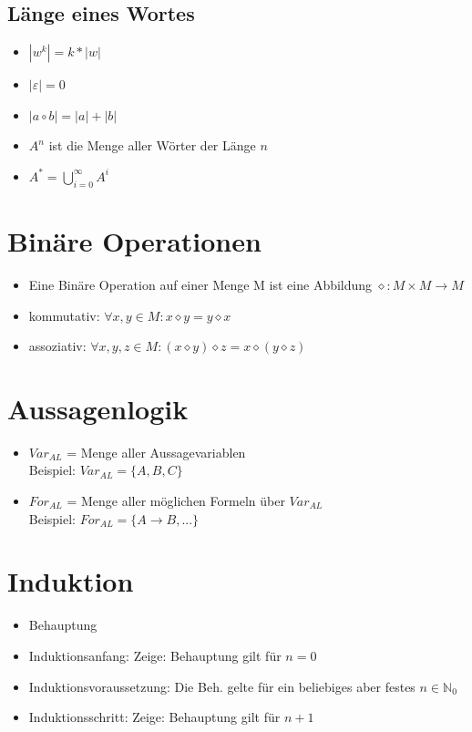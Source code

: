 \documentclass[a4paper,portrait]{scrartcl}
\begin{document}
\subsection{Länge eines Wortes}
\begin{itemize}
\item $ |w^{k}| = k * |w|  $ 
\item $ |\varepsilon| = 0 $ 
\item $ |a \circ b|=|a|+|b| $ 
\item $A^{n}$ ist die Menge aller Wörter der Länge $n$ 
\item $A^{*} = \bigcup\limits_{i = 0}^{\infty} A^{i}$
\end{itemize}
\section{Binäre Operationen}
\begin{itemize}
\item Eine Binäre Operation auf einer Menge M ist eine Abbildung $\diamond: M \times M \rightarrow M$ 
\item kommutativ: $ \forall x,y \in M: x \diamond y = y \diamond x $ 
\item assoziativ: $ \forall x,y,z \in M: (x \diamond y) \diamond z = x \diamond (y \diamond z)$\\
\end{itemize}
\section{Aussagenlogik}
\begin{itemize}
\item $ Var_{AL} $ = Menge aller Aussagevariablen \\
Beispiel: $ Var_{AL} = \lbrace A,B,C \rbrace$
\item $ For_{AL} $ = Menge aller möglichen Formeln über $ Var_{AL} $ \\
Beispiel: $ For_{AL} = \lbrace A \rightarrow B, ...\rbrace$
\end{itemize}
\section{Induktion}
\begin{itemize}
\item Behauptung
\item Induktionsanfang: Zeige: Behauptung gilt für $ n = 0 $
\item Induktionsvoraussetzung: Die Beh. gelte für ein beliebiges aber festes $n \in \mathbb{N}_{0}$
\item Induktionsschritt: Zeige: Behauptung gilt für $ n + 1 $
\end{itemize}
\end{document}

